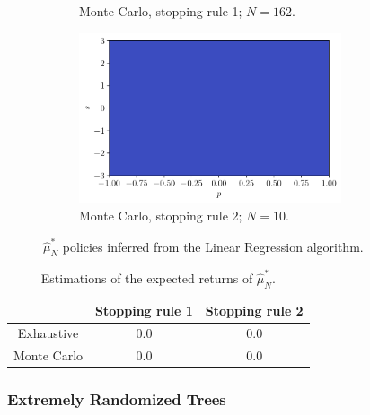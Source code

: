 \documentclass[a4paper, 12pt]{article}
\begin{document}
\begin{figure}[H]
\begin{subfigure}{0.49\textwidth}
            \caption{Monte Carlo, stopping rule 1; $N = 162$.}
        \end{subfigure}
        \hfill
        \begin{subfigure}{0.49\textwidth}
            \centering
            \includegraphics[width=0.85\textwidth]{resources/pdf/4_montecarlo_2_LR_mu.pdf}
            \caption{Monte Carlo, stopping rule 2; $N = 10$.}
        \end{subfigure}
        \caption{$\hat{\mu}_{N}^{*}$ policies inferred from the Linear Regression algorithm.}
        \label{fig:mu.lr}
    \end{figure}
    
    \begin{table}[H]
        \centering
        \begin{tabular}{c|c|c}
            & Stopping rule 1 & Stopping rule 2 \\
            \hline
            Exhaustive & \num{0.0} & \num{0.0} \\
            Monte Carlo & \num{0.0} & \num{0.0} \\
        \end{tabular}
        \caption{Estimations of the expected returns of $\hat{\mu}^*_N$.}
        \label{tab:expected.return.mu.lr}
    \end{table}
    
    \newpage
    
    \subsubsection{Extremely Randomized Trees}
    
\end{document}
